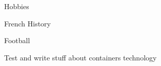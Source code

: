 

\begin{cventries}

  \cventry
    {} %
    {Hobbies} %
    {} {} {
      \begin{cvitems} %
      \item {French History}
      \item {Football}
      \item {Test and write stuff about containers technology}
      \end{cvitems}
    }

\end{cventries}
